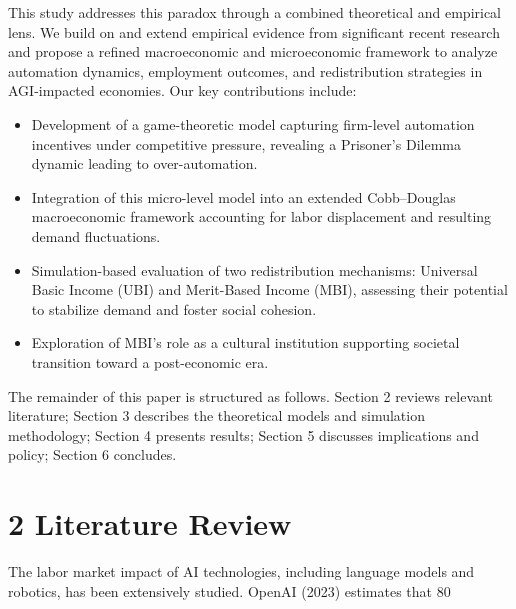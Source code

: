\documentclass[11pt]{amsart}
\begin{document}
This study addresses this paradox through a combined theoretical and empirical lens. We build on and extend empirical evidence from significant recent research \cite{OpenAI2023,StanfordAI2025,MIT2025} and propose a refined macroeconomic and microeconomic framework to analyze automation dynamics, employment outcomes, and redistribution strategies in AGI-impacted economies. Our key contributions include:


\begin{itemize}

\item Development of a game-theoretic model capturing firm-level automation incentives under competitive pressure, revealing a Prisoner’s Dilemma dynamic leading to over-automation.

\item Integration of this micro-level model into an extended Cobb–Douglas macroeconomic framework accounting for labor displacement and resulting demand fluctuations.

\item Simulation-based evaluation of two redistribution mechanisms: Universal Basic Income (UBI) and Merit-Based Income (MBI), assessing their potential to stabilize demand and foster social cohesion.

\item Exploration of MBI’s role as a cultural institution supporting societal transition toward a post-economic era.

\end{itemize}


The remainder of this paper is structured as follows. Section 2 reviews relevant literature; Section 3 describes the theoretical models and simulation methodology; Section 4 presents results; Section 5 discusses implications and policy; Section 6 concludes.


\hypertarget{x-2-literature-review}{\section{2 Literature Review}}
The labor market impact of AI technologies, including language models and robotics, has been extensively studied. OpenAI (2023) estimates that 80%
\end{document}
